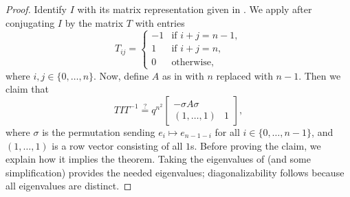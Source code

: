 \begin{proof}
    Identify $I$ with its matrix representation given in . We apply  after conjugating $I$ by the matrix $T$ with entries
    \[T_{ij}=\begin{cases}
        -1 & \text{if }i+j=n-1, \\
        1 & \text{if }i+j=n, \\
        0 & \text{otherwise},
    \end{cases}\]
    where $i,j\in\{0,\ldots,n\}$. Now, define $A$ as in  with $n$ replaced with $n-1$. Then we claim that
    \begin{equation}
        TIT^{-1} \stackrel?= q^{n^2}\begin{bmatrix}
            -\sigma A\sigma \\
            (1,\ldots,1) & 1
        \end{bmatrix}, \label{eq:conj-intertwining-gl}
    \end{equation}
    where $\sigma$ is the permutation sending $e_i\mapsto e_{n-1-i}$ for all $i\in\{0,\ldots,n-1\}$, and $(1,\ldots,1)$ is a row vector consisting of all $1$s. Before proving the claim, we explain how it implies the theorem. Taking the eigenvalues of  (and some simplification) provides the needed eigenvalues; diagonalizability follows because all eigenvalues are distinct.


\end{proof}
